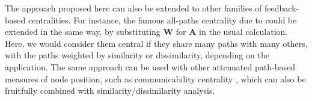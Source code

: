 \documentclass[12pt]{article}
\begin{document}
The approach proposed here can also be extended to other families of feedback-based centralities. For instance, the famous all-paths centrality due to \citet{katz1953new-19a} could be extended in the same way, by substituting $\mathbf{W}$ for $\mathbf{A}$ in the usual calculation. Here, we would consider them central if they share many paths with many others, with the paths weighted by similarity or dissimilarity, depending on the application. The same approach can be used with other attenuated path-based measures of node position, such as communicability centrality \citep{estrada2010network-294}, which can also be fruitfully combined with similarity/dissimilarity analysis. 




\newpage


\end{document}
